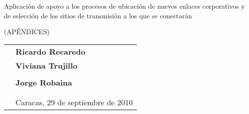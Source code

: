 \vspace*{3.5cm}
\begin{center}
\begin{LARGE}
Aplicaci\'on de apoyo a los procesos de ubicaci\'on de nuevos enlaces corporativos y de selecci\'on de los sitios de transmisi\'on a los que se conectar\'an

(AP\'ENDICES)
\end{LARGE}
\vspace{\fill}
{
\begin{tabular}{p{6.5cm}l}
& \textbf{Ricardo Recaredo}\tabularnewline
 & \textbf{Viviana Trujillo}\tabularnewline
\multicolumn{1}{l}{} & \multicolumn{1}{l}{}\tabularnewline
\multicolumn{1}{l}{}& \multicolumn{1}{l}{\textbf{Jorge Robaina}}\tabularnewline
\multicolumn{1}{l}{} & \multicolumn{1}{l}{}\tabularnewline
\multicolumn{1}{l}{} & \multicolumn{1}{l}{}\tabularnewline
\multicolumn{1}{l}{}& \multicolumn{1}{l}{Caracas, 29 de septiembre de 2010} \tabularnewline
\end{tabular}
}
\end{center}
